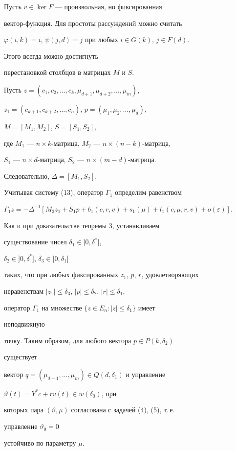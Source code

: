 \begin{pf} 


Пусть $v\in\ker F$ --- произвольная, но фиксированная 


вектор-функция. Для простоты рассуждений можно считать 


$\varphi(i,k)=i$, $\psi(j,d)=j$ при любых $i\in G(k)$, $j\in F(d)$. 


Этого всегда можно достигнуть 


перестановкой столбцов в матрицах $M$ и $S$. 


Пусть $z=(c_1,c_2,\dotsc,c_k,\mu_{d+1},\mu_{d+2},\dotsc,\mu_m)$, 


$z_1=(c_{k+1},c_{k+2},\dotsc,c_n)$, $p=(\mu_1,\mu_2,\dotsc,\mu_d)$, 


$M=[M_1,M_2]$, $S=[S_1,S_2]$, 


где $M_1$ --- $n\times k$-матрица, $M_2$ --- $n\times(n{-}k)$-матрица, 


$S_1$ --- $n\times d$-матрица, $S_2$ --- $n\times(m{-}d)$-матрица. 


Следовательно, $\Delta=[M_1,S_2]$. 


Учитывая систему (13), оператор $\Gamma_1$ определим равенством 


$\Gamma_1z=-\Delta^{-1}[M_2z_1+S_1p+b_1(c,r,v)+s_1(\mu)+ 


l_1(c,\mu,r,v)+o(\varepsilon)]$. 


Как и при доказательстве теоремы 3, устанавливаем 


существование чисел $\delta_1\in]0,\delta^*]$, 


$\delta_2\in]0,\delta^*]$, $\delta_3\in]0,\delta_1]$ 


таких, что при любых фиксированных $z_1$, $p$, $r$, удовлетворяющих 


неравенствам $|z_1|\le\delta_3$, $|p|\le\delta_2$, $|r|\le\delta_1$, 


оператор $\Gamma_1$ на множестве $\{z\in E_n:|z|\le\delta_1\}$ имеет 


неподвижную 


точку. Таким образом, для любого вектора $p\in P(k,\delta_2)$ 


существует 


вектор $q=(\mu_{d+1},\dotsc,\mu_m)\in Q(d,\delta_1)$ и управление 


$\vartheta(t)=Y^*c+r v(t)\in w(\delta_0)$, при 


которых пара $(\vartheta,\mu)$ согласована с задачей (4), (5), т.\,е. 


управление $\vartheta_0=0$ 


устойчиво по параметру $\mu$. 


\end{pf} 


